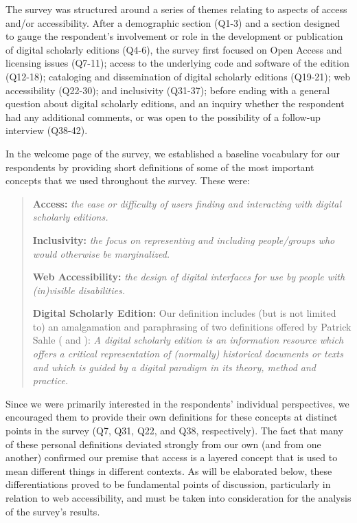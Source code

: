 \begin{paper}
The survey was structured around a series of themes relating to aspects
of access and/or accessibility. After a demographic section (Q1-3) and a
section designed to gauge the respondent's involvement or role in the
development or publication of digital scholarly editions (Q4-6), the
survey first focused on Open Access and licensing issues (Q7-11); access
to the underlying code and software of the edition (Q12-18); cataloging
and dissemination of digital scholarly editions (Q19-21); web
accessibility (Q22-30); and inclusivity (Q31-37); before ending with a
general question about digital scholarly editions, and an inquiry
whether the respondent had any additional comments, or was open to the
possibility of a follow-up interview (Q38-42).

In the welcome page of the survey, we established a baseline vocabulary
for our respondents by providing short definitions of some of the most
important concepts that we used throughout the survey. These were:
\begin{quote}
\textbf{Access:} \emph{the ease or difficulty of users finding and interacting with digital scholarly editions.}\par
\textbf{Inclusivity:} \emph{the focus on
representing and including people/groups who would otherwise be
marginalized.}\par
\textbf{Web Accessibility:} \emph{the design of digital interfaces for use by people with (in)visible disabilities.}\par
\textbf{Digital Scholarly Edition:} Our
definition includes (but is not limited to) an amalgamation and
paraphrasing of two definitions offered by Patrick Sahle (\citeyear{sahle_catalog_2008} and
\citeyear{sahle_what_2016}): \emph{A digital scholarly edition is an information resource
which offers a critical representation of (normally) historical
documents or texts and which is guided by a digital paradigm in its
theory, method and
practice.}
\end{quote}
Since we were primarily interested in the respondents' individual
perspectives, we encouraged them to provide their own definitions for
these concepts at distinct points in the survey (Q7, Q31, Q22, and Q38,
respectively). The fact that many of these personal definitions deviated
strongly from our own (and from one another) confirmed our premise that
access is a layered concept that is used to mean different things in
different contexts. As will be elaborated below, these differentiations
proved to be fundamental points of discussion, particularly in relation
to web accessibility, and must be taken into consideration for the
analysis of the survey's results.



\end{paper}
